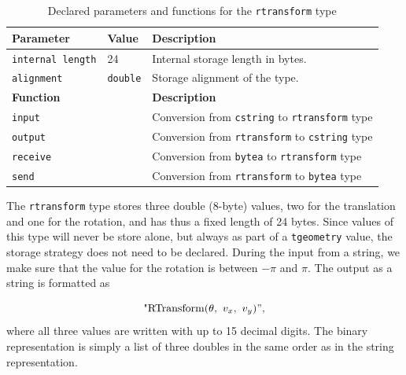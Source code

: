 \begin{table}[htb]
    \centering
    \begin{tabularx}{\textwidth}{|l|l|X|}
    \hline
    \textbf{Parameter}  & \textbf{Value}        & \textbf{Description} \\ 
    \hline
    \lstinline+internal length+     & 24                    & Internal storage length in bytes. \\
    \hline
    \lstinline+alignment+           & \lstinline+double+                & Storage alignment of the type. \\
    \hline
    \multicolumn{2}{|l|}{\textbf{Function}}     & \textbf{Description} \\ 
    \hline
    \multicolumn{2}{|l|}{\lstinline+input+}     & Conversion from \lstinline{cstring} to \lstinline{rtransform} type \\
    \hline
    \multicolumn{2}{|l|}{\lstinline+output+}    & Conversion from \lstinline{rtransform} to \lstinline{cstring} type \\
    \hline
    \multicolumn{2}{|l|}{\lstinline+receive+}               & Conversion from \lstinline{bytea} to \lstinline{rtransform} type \\
    \hline
    \multicolumn{2}{|l|}{\lstinline+send+}                  & Conversion from \lstinline{rtransform} to \lstinline{bytea} type \\
    \hline
    \end{tabularx}
    \caption{Declared parameters and functions for the \lstinline{rtransform} type}
    \label{table:rtransform_type_declaration}
\end{table}

The \lstinline+rtransform+ type stores three double (8-byte) values, two for the translation and one for the rotation, and has thus a fixed length of 24 bytes. Since values of this type will never be store alone, but always as part of a \lstinline+tgeometry+ value, the storage strategy does not need to be declared. During the input from a string, we make sure that the value for the rotation is between $-\pi$ and $\pi$. The output as a string is formatted as

\[
    \text{"RTransform(}\theta,\ v_x,\ v_y{)"}, 
\]
where all three values are written with up to 15 decimal digits. The binary representation is simply a list of three doubles in the same order as in the string representation.

